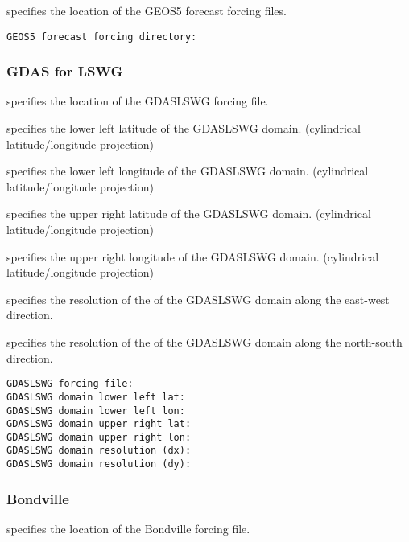  
  specifies the location
 of the GEOS5 forecast forcing files.
 

 \begin{Verbatim}[frame=single]
GEOS5 forecast forcing directory:
 \end{Verbatim}

 
 \subsubsection{GDAS for LSWG} \label{sssec:gdaslswg}
 

 
  specifies the location of the
 GDASLSWG forcing file.

  specifies the lower left
 latitude of the GDASLSWG domain.
 (cylindrical latitude/longitude projection)

  specifies the lower left
 longitude of the GDASLSWG domain.
 (cylindrical latitude/longitude projection)

  specifies the upper right
 latitude of the GDASLSWG domain.
 (cylindrical latitude/longitude projection)

  specifies the upper right
 longitude of the GDASLSWG domain.
 (cylindrical latitude/longitude projection)

  specifies the resolution of the 
 of the GDASLSWG domain along the east-west direction.

  specifies the resolution of the 
 of the GDASLSWG domain along the north-south direction.
 

 \begin{Verbatim}[frame=single]
GDASLSWG forcing file:
GDASLSWG domain lower left lat:
GDASLSWG domain lower left lon:
GDASLSWG domain upper right lat:
GDASLSWG domain upper right lon:
GDASLSWG domain resolution (dx):
GDASLSWG domain resolution (dy):
 \end{Verbatim}

 
 \subsubsection{Bondville} \label{sssec:bondville}
 

 
  specifies the location of the
 Bondville forcing file.
 

